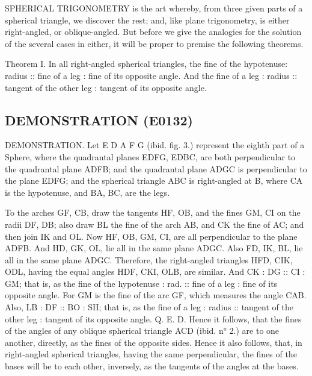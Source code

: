 \documentclass{article}
\begin{document}
SPHERICAL TRIGONOMETRY is the art whereby, from three given parts of a spherical triangle, we discover the rest; and, like plane trigonometry, is either right-angled, or oblique-angled. But before we give the analogies for the solution of the several cases in either, it will be proper to premise the following theorems.

Theorem I. In all right-angled spherical triangles, the fine of the hypotenuse: radius :: fine of a leg : fine of its opposite angle. And the fine of a leg : radius :: tangent of the other leg : tangent of its opposite angle.

\subsection*{DEMONSTRATION (E0132)}
DEMONSTRATION. Let E D A F G (ibid. fig. 3.) represent the eighth part of a Sphere, where the quadrantal planes EDFG, EDBC, are both perpendicular to the quadrantal plane ADFB; and the quadrantal plane ADGC is perpendicular to the plane EDFG; and the spherical triangle ABC is right-angled at B, where CA is the hypotenuse, and BA, BC, are the legs.

To the arches GF, CB, draw the tangents HF, OB, and the fines GM, CI on the radii DF, DB; also draw BL the fine of the arch AB, and CK the fine of AC; and then join IK and OL. Now HF, OB, GM, CI, are all perpendicular to the plane ADFB. And HD, GK, OL, lie all in the same plane ADGC. Also FD, IK, BL, lie all in the same plane ADGC. Therefore, the right-angled triangles HFD, CIK, ODL, having the equal angles HDF, CKI, OLB, are similar. And CK : DG :: CI : GM; that is, as the fine of the hypotenuse : rad. :: fine of a leg : fine of its opposite angle. For GM is the fine of the arc GF, which measures the angle CAB. Also, LB : DF :: BO : SH; that is, as the fine of a leg : radius :: tangent of the other leg : tangent of its opposite angle. Q. E. D. Hence it follows, that the fines of the angles of any oblique spherical triangle ACD (ibid. n° 2.) are to one another, directly, as the fines of the opposite sides. Hence it also follows, that, in right-angled spherical triangles, having the same perpendicular, the fines of the bases will be to each other, inversely, as the tangents of the angles at the bases.
\end{document}
